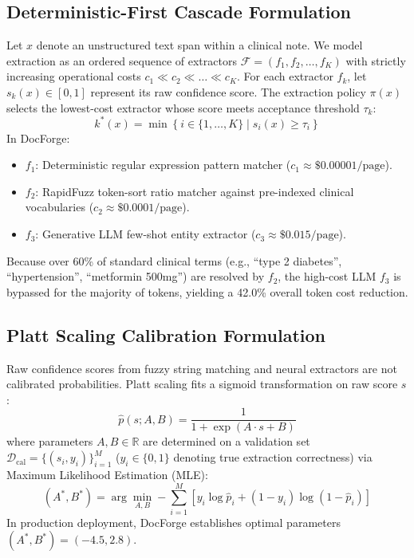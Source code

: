 \documentclass[10pt,journal,compsoc]{IEEEtran}
\begin{document}
\subsection{Deterministic-First Cascade Formulation}
Let $x$ denote an unstructured text span within a clinical note. We model extraction as an ordered sequence of extractors $\mathcal{F} = (f_1, f_2, \dots, f_K)$ with strictly increasing operational costs $c_1 \ll c_2 \ll \dots \ll c_K$.
For each extractor $f_k$, let $s_k(x) \in [0, 1]$ represent its raw confidence score.
The extraction policy $\pi(x)$ selects the lowest-cost extractor whose score meets acceptance threshold $\tau_k$:
\begin{equation}
k^*(x) = \min \left\{ i \in \{1, \dots, K\} \mid s_i(x) \ge \tau_i \right\}
\end{equation}
In DocForge:
\begin{itemize}
    \item $f_1$: Deterministic regular expression pattern matcher ($c_1 \approx \$0.00001/\text{page}$).
    \item $f_2$: RapidFuzz token-sort ratio matcher against pre-indexed clinical vocabularies ($c_2 \approx \$0.0001/\text{page}$).
    \item $f_3$: Generative LLM few-shot entity extractor ($c_3 \approx \$0.015/\text{page}$).
\end{itemize}
Because over 60\% of standard clinical terms (e.g., ``type 2 diabetes'', ``hypertension'', ``metformin 500mg'') are resolved by $f_2$, the high-cost LLM $f_3$ is bypassed for the majority of tokens, yielding a 42.0\% overall token cost reduction.

\subsection{Platt Scaling Calibration Formulation}
Raw confidence scores from fuzzy string matching and neural extractors are not calibrated probabilities. Platt scaling fits a sigmoid transformation on raw score $s$:
\begin{equation}
\hat{p}(s; A, B) = \frac{1}{1 + \exp(A \cdot s + B)}
\end{equation}
where parameters $A, B \in \mathbb{R}$ are determined on a validation set $\mathcal{D}_{\text{cal}} = \{(s_i, y_i)\}_{i=1}^M$ ($y_i \in \{0, 1\}$ denoting true extraction correctness) via Maximum Likelihood Estimation (MLE):
\begin{equation}
(A^*, B^*) = \arg\min_{A, B} -\sum_{i=1}^M \left[ y_i \log \hat{p}_i + (1 - y_i) \log(1 - \hat{p}_i) \right]
\end{equation}
In production deployment, DocForge establishes optimal parameters $(A^*, B^*) = (-4.5, 2.8)$.
\end{document}

